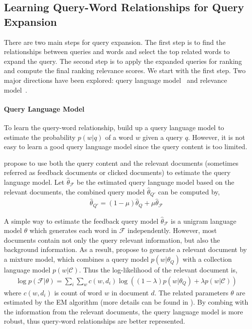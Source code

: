 \subsection{Learning Query-Word Relationships for Query Expansion}

There are two main steps for query expansion. The first step is to
find the relationships between queries and words and select the top
related words to expand the query. The second step is to apply the
expanded queries for ranking and compute the final ranking relevance
scores. We start with the first step. Two major directions have been
explored: query language model~\citep{zhai-01b} and relevance
model~\citep{Lavrenko-2001}.

\paragraph{Query Language Model}

To learn the query-word relationship, \cite{zhai-01b} build up a query
language model to estimate the probability $p(w|q)$ of a word $w$
given a query $q$. However, it is not easy to learn a good query
language model since the query content is too limited.

\cite{zhai-01b} propose to use both the query content and the relevant
documents (sometimes referred as feedback documents or clicked
documents) to estimate the query language model. Let
$\hat{\theta}_{\mathcal{F}}$ be the estimated query language model
based on the relevant documents, the combined query model
$\hat{\theta}_{Q'}$ can be computed by,
\begin{align}
\label{eq:qlm-comb}
\hat{\theta}_{Q'} = (1 - \mu)\hat{\theta}_{Q} + \mu \hat{\theta}_{\mathcal{F}}
\end{align}

A simple way to estimate the feedback query model
$\hat{\theta}_{\mathcal{F}}$ is a unigram language model $\theta$
which generates each word in $\mathcal{F}$ independently. However,
most documents contain not only the query relevant information, but
also the background information. As a result, \cite{zhai-01b} propose
to generate a relevant document by a mixture model, which combines a
query model $p(w|\theta_Q)$ with a collection language model
$p(w|\mathcal{C})$. Thus the log-likelihood of the relevant document
is,
\begin{align}
\log p(\mathcal{F}|\theta) = \sum_i \sum_w c(w, d_i) \log((1-\lambda)p(w|\theta_Q) + \lambda p(w|\mathcal{C}))
\end{align}
where $c(w, d_i)$ is count of word $w$ in document $d$. The related parameters $\theta$ are estimated by the EM algorithm (more details can be found in \cite{zhai-01b}). By combing with the information from the relevant documents, the query language model is more robust, thus query-word relationships are better represented.

